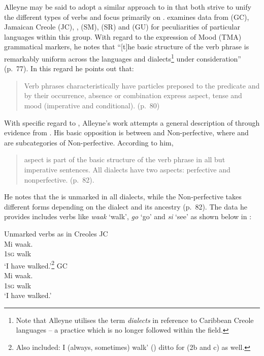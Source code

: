Alleyne may be said to adopt a similar approach to
\citet{Voorhoeve1957} in that both strive to unify the different types
of verbs and focus primarily on .
\citet{Alleyne1980} examines data from  (GC), Jamaican
Creole (JC), ,  (SM),  (SR) and  (GU) for
peculiarities of particular languages within this group.  With regard
to the expression of  Mood  (TMA) grammatical markers, he
notes that ``[t]he basic structure of the verb phrase is remarkably
uniform across the languages and dialects\footnote{Note that Alleyne
  utilises the term \textit{dialects} in reference to Caribbean Creole
  languages -- a practice which is no longer followed within the field.}
under consideration” (p.~77).  In this regard he points out that:

\begin{quote}
Verb phrases characteristically have particles preposed to the
predicate and by their occurrence, absence or combination express
aspect, tense and mood (imperative and conditional). (p.~80)
\end{quote}

With specific regard to , Alleyne’s work attempts a general
description of  through evidence from .  His
basic opposition is between  and Non-perfective, where
 and  are subcategories of Non-perfective.
According to him,

\begin{quote}
aspect is part of the basic structure of the verb phrase in all but
imperative sentences. All dialects have two aspects: perfective and
nonperfective. (p.~82).
\end{quote}

\largerpage
He notes that the  is unmarked in all dialects, while the
Non-per\-fec\-tive takes different forms depending on the dialect and its
ancestry (p.~82).  The data he provides includes verbs like
\textit{waak} `walk', \textit{go} `go' and \textit{si} `see' as shown
below in :

\ea\label{ex:2:2} {Unmarked verbs as  in Creoles
  \citep[82]{Alleyne1980}} \ea
JC \\
\gll Mi waak.\\
\textsc{1sg} walk   \\
\glt `I have walked.'\footnote{Also included: I (always, sometimes)
  walk’ () ditto for (2b and c) as well.}  \ex
GC \\
\gll Mi waak.\\
\textsc{1sg} walk\\
\glt `I have walked.'

